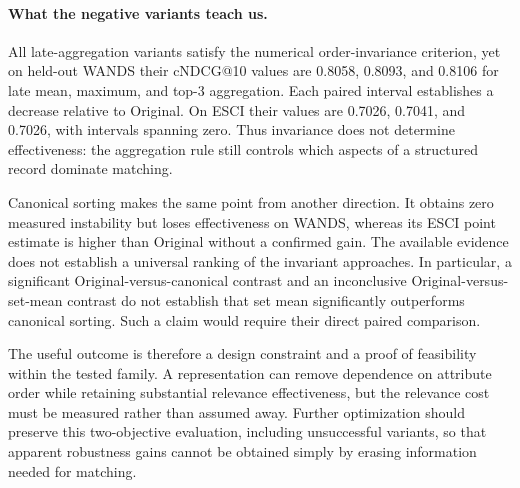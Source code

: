 \paragraph{What the negative variants teach us.}
All late-aggregation variants satisfy the numerical order-invariance criterion, yet on held-out WANDS their cNDCG@10 values are 0.8058, 0.8093, and 0.8106 for late mean, maximum, and top-3 aggregation. Each paired interval establishes a decrease relative to Original. On ESCI their values are 0.7026, 0.7041, and 0.7026, with intervals spanning zero. Thus invariance does not determine effectiveness: the aggregation rule still controls which aspects of a structured record dominate matching.

Canonical sorting makes the same point from another direction. It obtains zero measured instability but loses effectiveness on WANDS, whereas its ESCI point estimate is higher than Original without a confirmed gain. The available evidence does not establish a universal ranking of the invariant approaches. In particular, a significant Original-versus-canonical contrast and an inconclusive Original-versus-set-mean contrast do not establish that set mean significantly outperforms canonical sorting. Such a claim would require their direct paired comparison.

The useful outcome is therefore a design constraint and a proof of feasibility within the tested family. A representation can remove dependence on attribute order while retaining substantial relevance effectiveness, but the relevance cost must be measured rather than assumed away. Further optimization should preserve this two-objective evaluation, including unsuccessful variants, so that apparent robustness gains cannot be obtained simply by erasing information needed for matching.
